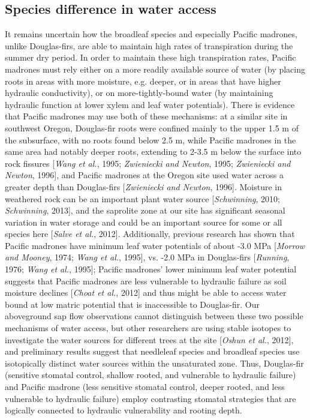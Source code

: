 \subsection{Species difference in water access}
It remains uncertain how the broadleaf species and especially Pacific madrones, unlike Douglas-firs, are able to maintain high rates of transpiration during the summer dry period. In order to maintain these high transpiration rates, Pacific madrones must rely either on a more readily available source of water (by placing roots in areas with more moisture, e.g. deeper, or in areas that have higher hydraulic conductivity), or on more-tightly-bound water (by maintaining hydraulic function at lower xylem and leaf water potentials).  There is evidence that Pacific madrones may use both of these mechanisms: at a similar site in southwest Oregon, Douglas-fir roots were confined mainly to the upper 1.5 m of the subsurface, with no roots found below 2.5 m, while Pacific madrones in the same area had notably deeper roots, extending to 2-3.5 m below the surface into rock fissures [\textit{Wang et al.}, 1995; \textit{Zwieniecki and Newton}, 1995;  \textit{Zwieniecki and Newton}, 1996], and Pacific madrones at the Oregon site used water across a greater depth than Douglas-firs [\textit{Zwieniecki and Newton}, 1996].  Moisture in weathered rock can be an important plant water source [\textit{Schwinning}, 2010; \textit{Schwinning}, 2013], and the saprolite zone at our site has significant seasonal variation in water storage and could be an important source for some or all species here [\textit{Salve et al.}, 2012].  Additionally, previous research has shown that Pacific madrones have minimum leaf water potentials of about -3.0 MPa [\textit{Morrow and Mooney}, 1974; \textit{Wang et al.}, 1995], vs. -2.0 MPa in Douglas-firs [\textit{Running}, 1976; \textit{Wang et al.}, 1995]; Pacific madrones' lower minimum leaf water potential suggests that Pacific madrones are less vulnerable to hydraulic failure as soil moisture declines [\textit{Choat et al.}, 2012] and thus might be able to access water bound at low matric potential that is inaccessible to Douglas-fir. Our aboveground sap flow observations cannot distinguish between these two possible mechanisms of water access, but other researchers are using stable isotopes to investigate the water sources for different trees at the site [\textit{Oshun et al.}, 2012], and preliminary results suggest that needleleaf species and broadleaf species use isotopically distinct water sources within the unsaturated zone.  Thus, Douglas-fir (sensitive stomatal control, shallow rooted, and vulnerable to hydraulic failure) and Pacific madrone (less sensitive stomatal control, deeper rooted, and less vulnerable to hydraulic failure) employ contrasting stomatal strategies that are logically connected to hydraulic vulnerability and rooting depth.

